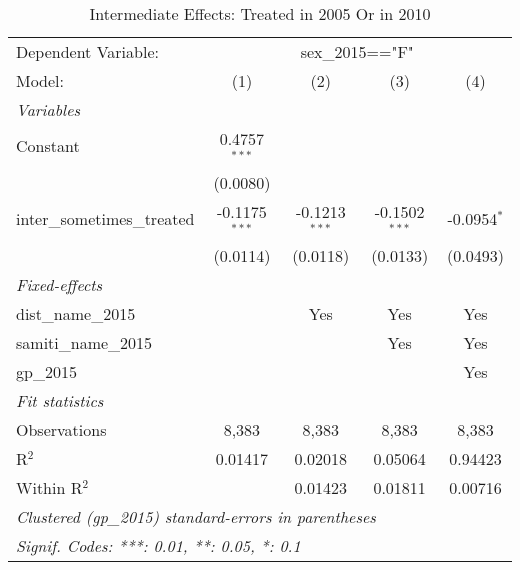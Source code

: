 
\begin{table}[htbp]
   \caption{Intermediate Effects: Treated in 2005 Or in 2010}
   \centering
   \begin{tabular}{lcccc}
      \tabularnewline \midrule \midrule
      Dependent Variable: & \multicolumn{4}{c}{sex\_2015=="F"}\\
      Model:                      & (1)             & (2)             & (3)             & (4)\\  
      \midrule
      \emph{Variables}\\
      Constant                    & 0.4757$^{***}$  &                 &                 &   \\   
                                  & (0.0080)        &                 &                 &   \\   
      inter\_sometimes\_treated   & -0.1175$^{***}$ & -0.1213$^{***}$ & -0.1502$^{***}$ & -0.0954$^{*}$\\   
                                  & (0.0114)        & (0.0118)        & (0.0133)        & (0.0493)\\   
      \midrule
      \emph{Fixed-effects}\\
      dist\_name\_2015            &                 & Yes             & Yes             & Yes\\  
      samiti\_name\_2015          &                 &                 & Yes             & Yes\\  
      gp\_2015                    &                 &                 &                 & Yes\\  
      \midrule
      \emph{Fit statistics}\\
      Observations                & 8,383           & 8,383           & 8,383           & 8,383\\  
      R$^2$                       & 0.01417         & 0.02018         & 0.05064         & 0.94423\\  
      Within R$^2$                &                 & 0.01423         & 0.01811         & 0.00716\\  
      \midrule \midrule
      \multicolumn{5}{l}{\emph{Clustered (gp\_2015) standard-errors in parentheses}}\\
      \multicolumn{5}{l}{\emph{Signif. Codes: ***: 0.01, **: 0.05, *: 0.1}}\\
   \end{tabular}
\end{table}


